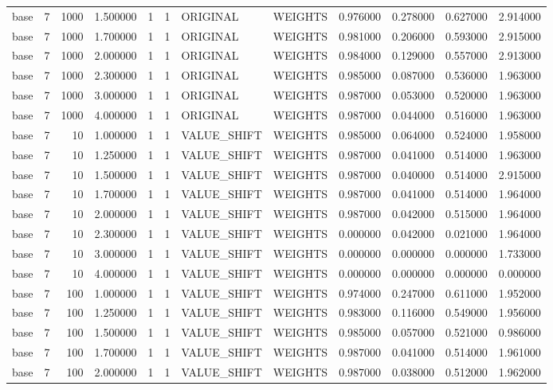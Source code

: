 \begin{tabular}{lrrrllllrrrr}
base & 7 & 1000 & 1.500000 & 1 & 1 & ORIGINAL & WEIGHTS & 0.976000 & 0.278000 & 0.627000 & 2.914000 \\
base & 7 & 1000 & 1.700000 & 1 & 1 & ORIGINAL & WEIGHTS & 0.981000 & 0.206000 & 0.593000 & 2.915000 \\
base & 7 & 1000 & 2.000000 & 1 & 1 & ORIGINAL & WEIGHTS & 0.984000 & 0.129000 & 0.557000 & 2.913000 \\
base & 7 & 1000 & 2.300000 & 1 & 1 & ORIGINAL & WEIGHTS & 0.985000 & 0.087000 & 0.536000 & 1.963000 \\
base & 7 & 1000 & 3.000000 & 1 & 1 & ORIGINAL & WEIGHTS & 0.987000 & 0.053000 & 0.520000 & 1.963000 \\
base & 7 & 1000 & 4.000000 & 1 & 1 & ORIGINAL & WEIGHTS & 0.987000 & 0.044000 & 0.516000 & 1.963000 \\
base & 7 & 10 & 1.000000 & 1 & 1 & VALUE_SHIFT & WEIGHTS & 0.985000 & 0.064000 & 0.524000 & 1.958000 \\
base & 7 & 10 & 1.250000 & 1 & 1 & VALUE_SHIFT & WEIGHTS & 0.987000 & 0.041000 & 0.514000 & 1.963000 \\
base & 7 & 10 & 1.500000 & 1 & 1 & VALUE_SHIFT & WEIGHTS & 0.987000 & 0.040000 & 0.514000 & 2.915000 \\
base & 7 & 10 & 1.700000 & 1 & 1 & VALUE_SHIFT & WEIGHTS & 0.987000 & 0.041000 & 0.514000 & 1.964000 \\
base & 7 & 10 & 2.000000 & 1 & 1 & VALUE_SHIFT & WEIGHTS & 0.987000 & 0.042000 & 0.515000 & 1.964000 \\
base & 7 & 10 & 2.300000 & 1 & 1 & VALUE_SHIFT & WEIGHTS & 0.000000 & 0.042000 & 0.021000 & 1.964000 \\
base & 7 & 10 & 3.000000 & 1 & 1 & VALUE_SHIFT & WEIGHTS & 0.000000 & 0.000000 & 0.000000 & 1.733000 \\
base & 7 & 10 & 4.000000 & 1 & 1 & VALUE_SHIFT & WEIGHTS & 0.000000 & 0.000000 & 0.000000 & 0.000000 \\
base & 7 & 100 & 1.000000 & 1 & 1 & VALUE_SHIFT & WEIGHTS & 0.974000 & 0.247000 & 0.611000 & 1.952000 \\
base & 7 & 100 & 1.250000 & 1 & 1 & VALUE_SHIFT & WEIGHTS & 0.983000 & 0.116000 & 0.549000 & 1.956000 \\
base & 7 & 100 & 1.500000 & 1 & 1 & VALUE_SHIFT & WEIGHTS & 0.985000 & 0.057000 & 0.521000 & 0.986000 \\
base & 7 & 100 & 1.700000 & 1 & 1 & VALUE_SHIFT & WEIGHTS & 0.987000 & 0.041000 & 0.514000 & 1.961000 \\
base & 7 & 100 & 2.000000 & 1 & 1 & VALUE_SHIFT & WEIGHTS & 0.987000 & 0.038000 & 0.512000 & 1.962000 \\

\end{tabular}

